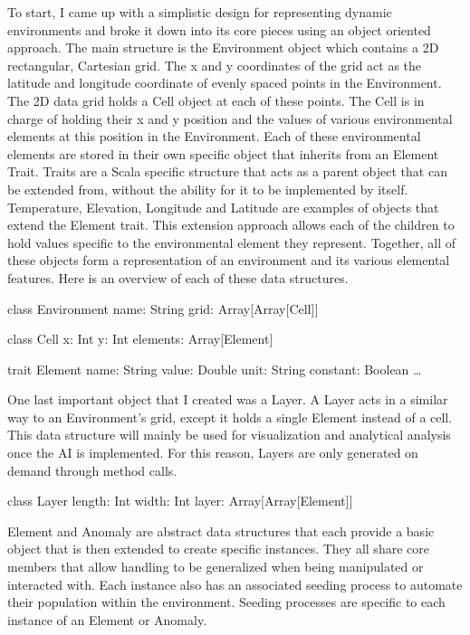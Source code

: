 \documentclass[]{report}
\begin{document}
To start, I came up with a simplistic design for representing dynamic environments and broke it down into its core pieces using an object oriented approach.
The main structure is the Environment object which contains a 2D rectangular, Cartesian grid. The x and y coordinates of the grid act as the latitude and longitude coordinate of evenly spaced points in the Environment.
The 2D data grid holds a Cell object at each of these points.
The Cell is in charge of holding their x and y position and the values of various environmental elements at this position in the Environment.
Each of these environmental elements are stored in their own specific object that inherits from an Element Trait.
Traits are a Scala specific structure that acts as a parent object that can be extended from, without the ability for it to be implemented by itself.
Temperature, Elevation, Longitude and Latitude are examples of objects that extend the Element trait.
This extension approach allows each of the children to hold values specific to the environmental element they represent.
Together, all of these objects form a representation of an environment and its various elemental features.
Here is an overview of each of these data structures.

class Environment {
	name: String
	grid: Array[Array[Cell]]
}

class Cell {
	x: Int
y: Int
	elements: Array[Element]
}

trait Element {
name: String
	value: Double
	unit: String
	constant: Boolean
	…
}

One last important object that I created was a Layer.
A Layer acts in a similar way to an Environment’s grid, except it holds a single Element instead of a cell.
This data structure will mainly be used for visualization and analytical analysis once the AI is implemented.
For this reason, Layers are only generated on demand through method calls.

class Layer {
	length: Int
	width: Int
	layer: Array[Array[Element]]
}

Element and Anomaly are abstract data structures that each provide a basic object that is then extended to create specific instances.
They all share core members that allow handling to be generalized when being manipulated or interacted with.
Each instance also has an associated seeding process to automate their population within the environment.
Seeding processes are specific to each instance of an Element or Anomaly.
\end{document}
